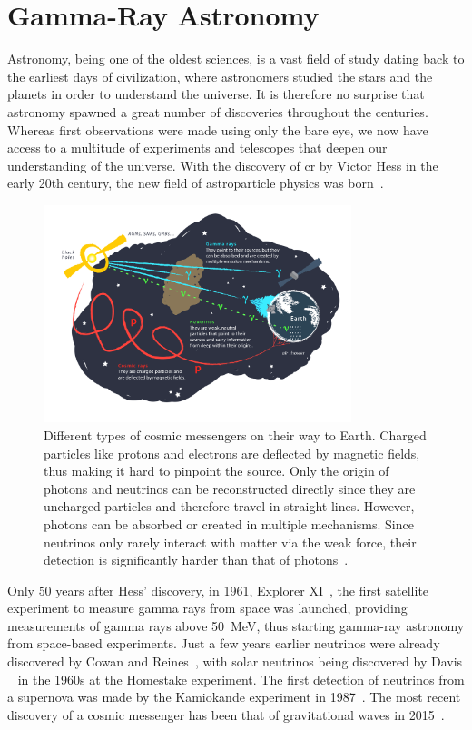 \chapter{Gamma-Ray Astronomy}%
\label{ch:gamma-ray-astronomy}

Astronomy, being one of the oldest sciences, is a vast field of study dating back to the earliest
days of civilization, where astronomers studied the stars and the planets in order to understand
the universe. It is therefore no surprise that astronomy spawned a great number of discoveries
throughout the centuries. Whereas first observations were made using only the bare eye, we now have access to a multitude
of experiments and telescopes that deepen our understanding of the universe. With the discovery of
\gls{cr} by Victor Hess in the early 20th century, the new field of astroparticle physics was born~\cite{longair1981}.

\begin{figure}
    \centering
    \includegraphics[width=0.8\textwidth]{graphics/figure5.png}
    \caption{Different types of cosmic messengers on their way to Earth. Charged particles like protons and electrons
    are deflected by magnetic fields, thus making it hard to pinpoint the source. Only the
    origin of photons and neutrinos can be reconstructed directly since they are uncharged particles
    and therefore travel in straight lines. However, photons can be absorbed or created in multiple
    mechanisms. Since neutrinos only rarely interact with matter via the weak force, their detection
    is significantly harder than that of photons~\cite{fig5}.}%
    \label{fig:fig5}
\end{figure}

Only \(\num{50}\) years after Hess' discovery, in 1961, Explorer XI~\cite{explorer11}, the first satellite experiment
to measure gamma rays from space was launched, providing measurements of gamma rays above
\SI{50}{\mega\eV}, thus starting gamma-ray astronomy from space-based experiments. Just a few years
earlier neutrinos were already discovered by Cowan and Reines~\cite{cowan1956}, with solar neutrinos being
discovered by Davis \etal{}~\cite{davis} in the 1960s at the Homestake experiment.
The first detection of neutrinos from a supernova was made by the Kamiokande experiment in 1987~\cite{kamiokande1987}.
The most recent discovery of a cosmic messenger has been that of gravitational
waves in 2015~\cite{grav_waves}.


